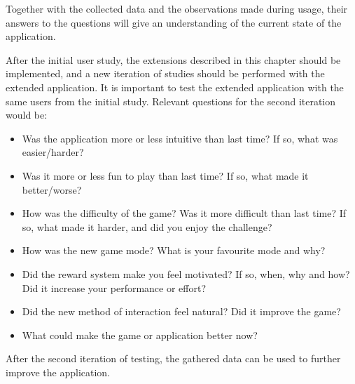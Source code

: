 Together with the collected data and the observations made during usage, their answers to the questions will give an understanding of the current state of the application.

After the initial user study, the extensions described in this chapter should be implemented, and a new iteration of studies should be performed with the extended application. It is important to test the extended application with the same users from the initial study. Relevant questions for the second iteration would be:

\begin{itemize}
	\item Was the application more or less intuitive than last time? If so, what was easier/harder?
	\item Was it more or less fun to play than last time? If so, what made it better/worse?
	\item How was the difficulty of the game? Was it more difficult than last time? If so, what made it harder, and did you enjoy the challenge?
	\item How was the new game mode? What is your favourite mode and why?
	\item Did the reward system make you feel motivated? If so, when, why and how? Did it increase your performance or effort?
	\item Did the new method of interaction feel natural? Did it improve the game?
	\item What could make the game or application better now?
\end{itemize}

After the second iteration of testing, the gathered data can be used to further improve the application.